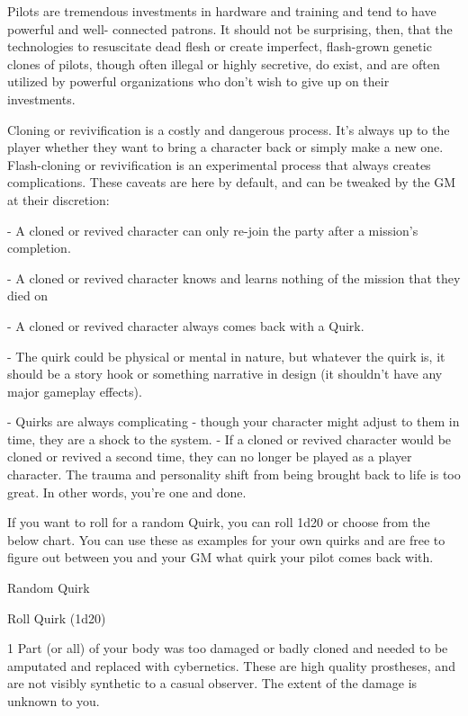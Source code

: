 Pilots are tremendous investments in hardware and training and tend to have powerful and well-
connected patrons. It should not be surprising, then, that the technologies to resuscitate dead
flesh or create imperfect, flash-grown genetic clones of pilots, though often illegal or highly
secretive, do exist, and are often utilized by powerful organizations who don’t wish to give up on
their investments.


Cloning or revivification is a costly and dangerous process. It’s always up to the player whether
they want to bring a character back or simply make a new one. Flash-cloning or revivification
is an experimental process that always creates complications. These caveats are here by
default, and can be tweaked by the GM at their discretion:


    -    A cloned or revived character can only re-join the party after a mission’s completion.

    -    A cloned or revived character knows and learns nothing of the mission that they died on

    -    A cloned or revived character always comes back with a Quirk.

             -   The quirk could be physical or mental in nature, but whatever the quirk is, it
                 should be a story hook or something narrative in design (it shouldn’t have any
                 major gameplay effects).

             -   Quirks are always complicating - though your character might adjust to them in
                 time, they are a shock to the system.
    -    If a cloned or revived character would be cloned or revived a second time, they can no
         longer be played as a player character. The trauma and personality shift from being
         brought back to life is too great. In other words, you’re one and done.


If you want to roll for a random Quirk, you can roll 1d20 or choose from the below chart. You can
use these as examples for your own quirks and are free to figure out between you and your GM
what quirk your pilot comes back with.


                                                 Random Quirk


 Roll
      Quirk
 (1d20)

 1          Part (or all) of your body was too damaged or badly cloned and needed to be amputated and
            replaced with cybernetics. These are high quality prostheses, and are not visibly synthetic to a
            casual observer. The extent of the damage is unknown to you.




